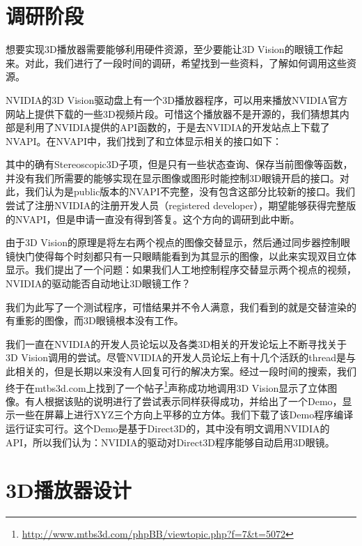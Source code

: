 \section{调研阶段}
\label{sec:3Dplayersurvey}

想要实现3D播放器需要能够利用硬件资源，至少要能让3D Vision的眼镜工作起来。对此，我们进行了一段时间的调研，希望找到一些资料，了解如何调用这些资源。


NVIDIA的3D Vision驱动盘上有一个3D播放器程序，可以用来播放NVIDIA官方网站上提供下载的一些3D视频片段。可惜这个播放器不是开源的，我们猜想其内部是利用了NVIDIA提供的API函数的，于是去NVIDIA的开发站点上下载了NVAPI。在NVAPI中，我们找到了和立体显示相关的接口如下：


其中的确有Stereoscopic3D子项，但是只有一些状态查询、保存当前图像等函数，并没有我们所需要的能够实现在显示图像或图形时能控制3D眼镜开启的接口。对此，我们认为是public版本的NVAPI不完整，没有包含这部分比较新的接口。我们尝试了注册NVIDIA的注册开发人员（registered developer），期望能够获得完整版的NVAPI，但是申请一直没有得到答复。这个方向的调研到此中断。


由于3D Vision的原理是将左右两个视点的图像交替显示，然后通过同步器控制眼镜快门使得每个时刻都只有一只眼睛能看到为其显示的图像，以此来实现双目立体显示。我们提出了一个问题：如果我们人工地控制程序交替显示两个视点的视频，NVIDIA的驱动能否自动地让3D眼镜工作？

我们为此写了一个测试程序，可惜结果并不令人满意，我们看到的就是交替渲染的有重影的图像，而3D眼镜根本没有工作。


我们一直在NVIDIA的开发人员论坛以及各类3D相关的开发论坛上不断寻找关于3D Vision调用的尝试。尽管NVIDIA的开发人员论坛上有十几个活跃的thread是与此相关的，但是长期以来没有人回复可行的解决方案。经过一段时间的搜索，我们终于在mtbs3d.com上找到了一个帖子\footnote{\href{http://www.mtbs3d.com/phpBB/viewtopic.php?f=7&t=5072}{http://www.mtbs3d.com/phpBB/viewtopic.php?f=7\&t=5072}}声称成功地调用3D Vision显示了立体图像。有人根据该贴的说明进行了尝试表示同样获得成功，并给出了一个Demo，显示一些在屏幕上进行XYZ三个方向上平移的立方体。我们下载了该Demo程序编译运行证实可行。这个Demo是基于Direct3D的，其中没有明文调用NVIDIA的API，所以我们认为：NVIDIA的驱动对Direct3D程序能够自动启用3D眼镜。

\section{3D播放器设计}
\label{sec:3dplayerdesign}

